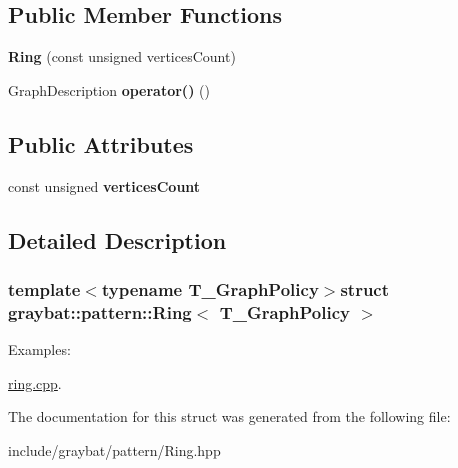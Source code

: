 \subsection*{Public Member Functions}
\begin{DoxyCompactItemize}
\item 
\hypertarget{structgraybat_1_1pattern_1_1Ring_a47c498d6957d3c1e777c18663462cccd}{}{\bfseries Ring} (const unsigned vertices\+Count)\label{structgraybat_1_1pattern_1_1Ring_a47c498d6957d3c1e777c18663462cccd}

\item 
\hypertarget{structgraybat_1_1pattern_1_1Ring_ae74145d3758ee4ea91cbfc758b21836c}{}Graph\+Description {\bfseries operator()} ()\label{structgraybat_1_1pattern_1_1Ring_ae74145d3758ee4ea91cbfc758b21836c}

\end{DoxyCompactItemize}
\subsection*{Public Attributes}
\begin{DoxyCompactItemize}
\item 
\hypertarget{structgraybat_1_1pattern_1_1Ring_ab602479b001f377bbb364afd6b9a1cf6}{}const unsigned {\bfseries vertices\+Count}\label{structgraybat_1_1pattern_1_1Ring_ab602479b001f377bbb364afd6b9a1cf6}

\end{DoxyCompactItemize}


\subsection{Detailed Description}
\subsubsection*{template$<$typename T\+\_\+\+Graph\+Policy$>$struct graybat\+::pattern\+::\+Ring$<$ T\+\_\+\+Graph\+Policy $>$}

\begin{Desc}
\item[Examples\+: ]\par
\hyperlink{ring_8cpp-example}{ring.\+cpp}.\end{Desc}


The documentation for this struct was generated from the following file\+:\begin{DoxyCompactItemize}
\item 
include/graybat/pattern/Ring.\+hpp\end{DoxyCompactItemize}
